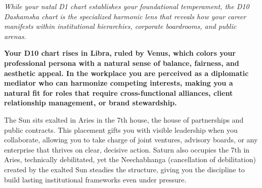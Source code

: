 


{\fontsize{9.5}{14}\selectfont\color{DeepSlate}\itshape While your natal D1 chart establishes your foundational temperament, the D10 Dashamsha chart is the specialized harmonic lens that reveals how your career manifests within institutional hierarchies, corporate boardrooms, and public arenas.}\par\vspace{3.5mm}

\label{topic25}

{\fontsize{9.5}{13.8}\selectfont\bfseries\color{DeepSlate} Your D10 chart rises in Libra, ruled by Venus, which colors your professional persona with a natural sense of balance, fairness, and aesthetic appeal. In the workplace you are perceived as a diplomatic mediator who can harmonize competing interests, making you a natural fit for roles that require cross-functional alliances, client relationship management, or brand stewardship.}\par\vspace{2mm}

{\fontsize{9}{13}\selectfont The Sun sits exalted in Aries in the 7th house, the house of partnerships and public contracts. This placement gifts you with visible leadership when you collaborate, allowing you to take charge of joint ventures, advisory boards, or any enterprise that thrives on clear, decisive action. Saturn also occupies the 7th in Aries, technically debilitated, yet the Neechabhanga (cancellation of debilitation) created by the exalted Sun steadies the structure, giving you the discipline to build lasting institutional frameworks even under pressure.}\par\vspace{1.8mm}

